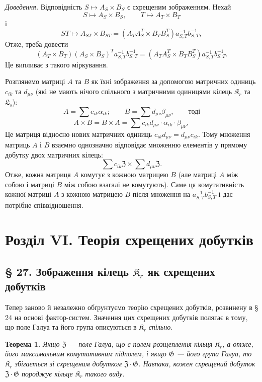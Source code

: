 \documentclass[11pt]{article}
\begin{document}
\noindent\emph{Доведення.} Відповідність \(S\mapsto A_S\times B_S\) є схрещеним зображенням. Нехай
\[
S\mapsto A_S\times B_S,\qquad T\mapsto A_T\times B_T
\]
і
\[
ST\mapsto A_{ST}\times B_{ST}
=(A_TA_S^T\times B_TB_S^T)a_{S,T}^{-1}b_{S,T}^{-1},
\]
Отже, треба довести
\[
(A_T\times B_T)(A_S\times B_S)^T a_{S,T}^{-1}b_{S,T}^{-1}
=(A_TA_S^T\times B_TB_S^T)a_{S,T}^{-1}b_{S,T}^{-1}.
\]
Це випливає з такого міркування.

Розглянемо матриці \(A\) та \(B\) як їхні зображення за допомогою матричних одиниць \(c_{ik}\) та \(d_{\mu\nu}\) (які не мають нічого спільного з матричними одиницями кілець \(\mathfrak K_r\) та \(\mathfrak L_s\)):
\[
A=\sum c_{ik}\alpha_{ik};\qquad
B=\sum d_{\mu\nu}\beta_{\mu\nu},\qquad\text{тоді}
\]
\[
A\times B=B\times A
=\sum c_{ik}d_{\mu\nu}\cdot\alpha_{ik}\cdot\beta_{\mu\nu},
\]
Це матриця відносно нових матричних одиниць \(c_{ik}d_{\mu\nu}=d_{\mu\nu}c_{ik}\). Тому множення матриць \(A\) і \(B\) взаємно однозначно відповідає множенню елементів у прямому добутку двох матричних кілець:
\[
\sum c_{ik}\mathfrak Z\times\sum d_{\mu\nu}\mathfrak Z.
\]
Отже, кожна матриця \(A\) комутує з кожною матрицею \(B\) (але матриці \(A\) між собою і матриці \(B\) між собою взагалі не комутують). Саме ця комутативність кожної матриці \(A\) з кожною матрицею \(B\) після множення на \(a_{S,T}^{-1}b_{S,T}^{-1}\) і дає потрібне співвідношення.

\section*{Розділ VI. Теорія схрещених добутків}\label{kapitel-vi.-theorie-der-verschraenkten-produkte}

\subsection*{§ 27. Зображення кілець \(\mathfrak K_r\) як схрещених добутків}

Тепер заново й незалежно обґрунтуємо теорію схрещених добутків, розвинену в § 24 на основі фактор-систем. Значення цих схрещених добутків полягає в тому, що поле Галуа та його група описуються в \(\mathfrak K_r\) \emph{спільно}.

\noindent\textbf{Теорема 1.} \emph{Якщо \(\mathfrak Z\) --- поле Галуа, що є полем розщеплення кільця \(\mathfrak K_r\), а отже, його максимальним комутативним підполем, і якщо \(\mathfrak G\) --- його група Галуа, то \(\mathfrak K_r\) збігається зі схрещеним добутком \(\mathfrak Z\cdot\mathfrak G\). Навпаки, кожен схрещений добуток \(\mathfrak Z\cdot\mathfrak G\) породжує кільце \(\mathfrak K_r\) такого виду.}
\end{document}
